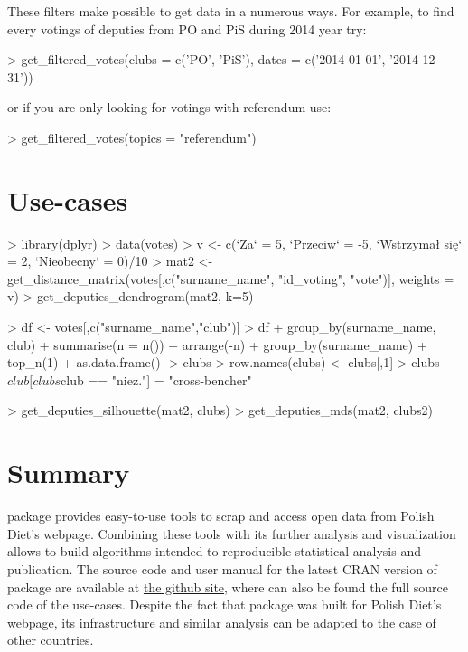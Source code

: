 These filters make possible to get data in a numerous ways. For example, to find every votings of deputies from PO and PiS during 2014 year try:

\begin{example}
> get_filtered_votes(clubs = c('PO', 'PiS'), dates = c('2014-01-01', '2014-12-31'))
\end{example}

or if you are only looking for votings with referendum use:

\begin{example}
> get_filtered_votes(topics = "referendum")
\end{example}

\section{Use-cases}


\begin{example}
> library(dplyr)
> data(votes)
> v <- c(`Za` = 5, `Przeciw` = -5, `Wstrzymał się` = 2, `Nieobecny` = 0)/10
> mat2 <- get_distance_matrix(votes[,c("surname_name", "id_voting", "vote")], weights = v)
> get_deputies_dendrogram(mat2, k=5)

> df <- votes[,c("surname_name","club")]
> df %
+   group_by(surname_name, club) %
+   summarise(n = n()) %
+   arrange(-n) %
+   group_by(surname_name) %
+   top_n(1) %
+   as.data.frame() -> clubs
> row.names(clubs) <- clubs[,1]
> clubs$club[clubs$club == "niez."] = "cross-bencher"

> get_deputies_silhouette(mat2, clubs)
> get_deputies_mds(mat2, clubs2)

\end{example}


\section{Summary}

 package provides easy-to-use tools to scrap and access open data from Polish Diet's webpage. Combining these tools with its further analysis and visualization
allows to build algorithms intended to reproducible statistical analysis and publication. The source code and user manual for the latest CRAN version of  package are available at \href{https://github.com/mi2-warsaw/sejmRP}{the github site}, where can also be found the full source code of the use-cases. Despite the fact that  package was built for Polish Diet's webpage, its infrastructure and similar analysis can be adapted to the case of other countries.

